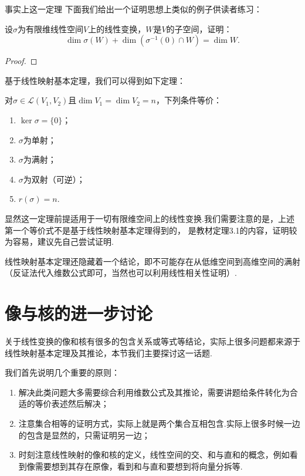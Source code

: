 事实上这一定理
下面我们给出一个证明思想上类似的例子供读者练习：
\begin{example}
    设$\sigma$为有限维线性空间$V$上的线性变换，$W$是$V$的子空间，证明：
    \[\dim\sigma(W)+\dim(\sigma^{-1}(0) \cap W)=\dim W.\]
\end{example}
\begin{proof}
    
\end{proof}
基于线性映射基本定理，我们可以得到如下定理：
\begin{theorem}
    对$\sigma \in \mathcal{L}(V_1,V_2)$且$\dim V_1=\dim V_2=n$，下列条件等价：
    \begin{enumerate}
        \item $\ker \sigma=\{0\}$；
        \item $\sigma$为单射；
        \item $\sigma$为满射；
        \item $\sigma$为双射（可逆）；
        \item $r(\sigma)=n$.
    \end{enumerate}
\end{theorem}
显然这一定理前提适用于一切有限维空间上的线性变换.我们需要注意的是，上述第一个等价式不是基于线性映射基本定理得到的，
是教材定理3.1的内容，证明较为容易，建议先自己尝试证明.

线性映射基本定理还隐藏着一个结论，即不可能存在从低维空间到高维空间的满射（反证法代入维数公式即可，当然也可以利用线性相关性证明）.

\section{像与核的进一步讨论}
关于线性变换的像和核有很多的包含关系或等式等结论，实际上很多问题都来源于线性映射基本定理及其推论，本节我们主要探讨这一话题.

我们首先说明几个重要的原则：
\begin{enumerate}
    \item 解决此类问题大多需要综合利用维数公式及其推论，需要讲题给条件转化为合适的等价表述然后解决；

    \item 注意集合相等的证明方式，实际上就是两个集合互相包含.实际上很多时候一边的包含是显然的，只需证明另一边；

    \item 时刻注意线性映射的像和核的定义，线性空间的交、和与直和的概念，例如看到像需要想到其存在原像，看到和与直和要想到将向量分拆等.
\end{enumerate}

